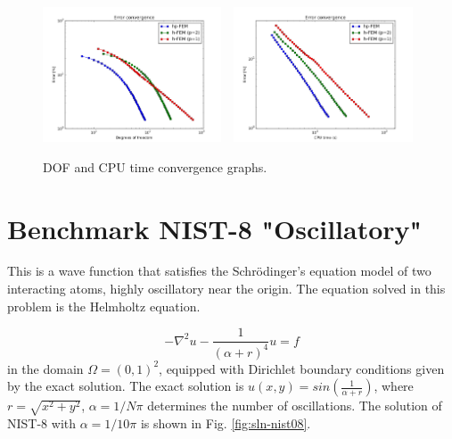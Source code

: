 \documentclass[12pt]{elsarticle}
\begin{document}
\begin{figure}[H]
\centering
\includegraphics[height=4cm]{nist/nist-7/conv_dof_aniso.png}\ \
\includegraphics[height=4cm]{nist/nist-7/conv_cpu_aniso.png}
\caption{DOF and CPU time convergence graphs.}
\label{fig:nist-7-conv}
\end{figure}


\section{Benchmark NIST-8 "Oscillatory"}
\label{sec:bench-8}

This is a wave function that satisfies the Schr\"{o}dinger's equation model of two
interacting atoms, highly oscillatory near the origin.
The equation solved in this problem is the Helmholtz equation.

\begin{equation} \label{oscillatory}
-\nabla^{2} u - \frac{1}{(\alpha + r)^{4}} u = f
\end{equation}
in the domain $\Omega = (0, 1)^2$, equipped with Dirichlet boundary conditions
given by the exact solution. The exact solution is
$u(x,y) = sin(\frac{1}{\alpha + r})$,
where $r = \sqrt{x^{2} + y^{2}}$, $\alpha = 1 / N \pi$ determines the number of oscillations.
The solution of NIST-8 with $\alpha = 1 / 10 \pi$ is shown in Fig. \ref{fig:sln-nist08}.
\end{document}
